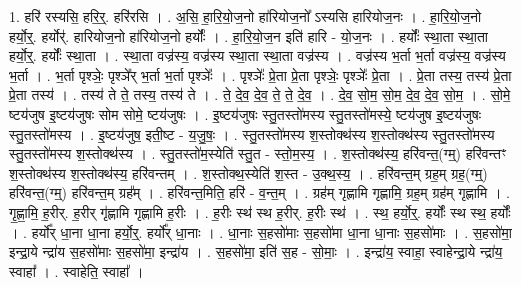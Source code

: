 \documentclass[17pt]{extarticle}
\begin{document}
1. हरि॑ रस्यसि॒ हरि॒र्॒. हरि॑रसि । . अ॒सि॒ हा॒रि॒यो॒ज॒नो हा॑रियोज॒नो᳚ ऽस्यसि हारियोज॒नः । . हा॒रि॒यो॒ज॒नो हर्यो॒र्॒. हर्योर्॑. हारियोज॒नो हा॑रियोज॒नो हर्योः᳚ । . हा॒रि॒यो॒ज॒न इति॑ हारि - यो॒ज॒नः । . हर्योः᳚ स्था॒ता स्था॒ता हर्यो॒र्॒. हर्योः᳚ स्था॒ता । . स्था॒ता वज्र॑स्य॒ वज्र॑स्य स्था॒ता स्था॒ता वज्र॑स्य । . वज्र॑स्य भ॒र्ता भ॒र्ता वज्र॑स्य॒ वज्र॑स्य भ॒र्ता । . भ॒र्ता पृश्ञेः॒ पृश्ञे᳚र् भ॒र्ता भ॒र्ता पृश्ञेः᳚ । . पृश्ञेः᳚ प्रे॒ता प्रे॒ता पृश्ञेः॒ पृश्ञेः᳚ प्रे॒ता । . प्रे॒ता तस्य॒ तस्य॑ प्रे॒ता प्रे॒ता तस्य॑ । . तस्य॑ ते ते॒ तस्य॒ तस्य॑ ते । . ते॒ दे॒व॒ दे॒व॒ ते॒ ते॒ दे॒व॒ । . दे॒व॒ सो॒म॒ सो॒म॒ दे॒व॒ दे॒व॒ सो॒म॒ । . सो॒मे॒ ष्टय॑जुष इ॒ष्टय॑जुषः सोम सोमे॒ ष्टय॑जुषः । . इ॒ष्टय॑जुषः स्तु॒तस्तो॑मस्य स्तु॒तस्तो॑मस्ये॒ ष्टय॑जुष इ॒ष्टय॑जुषः स्तु॒तस्तो॑मस्य । . इ॒ष्टय॑जुष॒ इती॒ष्ट - य॒जु॒षः॒ । . स्तु॒तस्तो॑मस्य श॒स्तोक्थ॑स्य श॒स्तोक्थ॑स्य स्तु॒तस्तो॑मस्य स्तु॒तस्तो॑मस्य श॒स्तोक्थ॑स्य । . स्तु॒तस्तो॑म॒स्येति॑ स्तु॒त - स्तो॒म॒स्य॒ । . श॒स्तोक्थ॑स्य॒ हरि॑वन्त॒(ग्म्॒) हरि॑वन्तꣳ श॒स्तोक्थ॑स्य श॒स्तोक्थ॑स्य॒ हरि॑वन्तम् । . श॒स्तोक्थ॒स्येति॑ श॒स्त - उ॒क्थ॒स्य॒ । . हरि॑वन्त॒म् ग्रह॒म् ग्रह॒(ग्म्॒) हरि॑वन्त॒(ग्म्॒) हरि॑वन्त॒म् ग्रह᳚म् । . हरि॑वन्त॒मिति॒ हरि॑ - व॒न्त॒म् । . ग्रह॑म् गृह्णामि गृह्णामि॒ ग्रह॒म् ग्रह॑म् गृह्णामि । . गृ॒ह्णा॒मि॒ ह॒रीर्. ह॒रीर् गृ॑ह्णामि गृह्णामि ह॒रीः । . ह॒रीः स्थ॑ स्थ ह॒रीर्. ह॒रीः स्थ॑ । . स्थ॒ हर्यो॒र्॒. हर्योः᳚ स्थ स्थ॒ हर्योः᳚ । . हर्यो᳚र् धा॒ना धा॒ना हर्यो॒र्॒. हर्यो᳚र् धा॒नाः । . धा॒नाः स॒हसो॑माः स॒हसो॑मा धा॒ना धा॒नाः स॒हसो॑माः । . स॒हसो॑मा॒ इन्द्रा॒ये न्द्रा॑य स॒हसो॑माः स॒हसो॑मा॒ इन्द्रा॑य । . स॒हसो॑मा॒ इति॑ स॒ह - सो॒माः॒ । . इन्द्रा॑य॒ स्वाहा॒ स्वाहेन्द्रा॒ये न्द्रा॑य॒ स्वाहा᳚ । . स्वाहेति॒ स्वाहा᳚ । \newline
\end{document}
